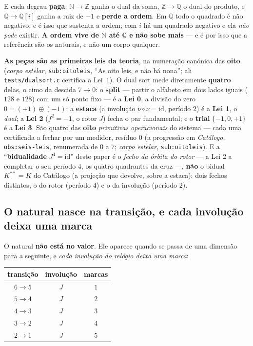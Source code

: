 \documentclass[11pt,a4paper]{article}
\newcommand{\code}[1]{\texttt{\small #1}}
\newcommand{\N}{\ensuremath{\mathbb{N}}}
\newcommand{\Z}{\ensuremath{\mathbb{Z}}}
\newcommand{\Q}{\ensuremath{\mathbb{Q}}}
\begin{document}
\noindent E cada degrau \textbf{paga}: $\N\to\Z$ ganha o dual da soma, $\Z\to\Q$ o dual do
produto, e $\Q\to\Q[i]$ ganha a raiz de $-1$ e \textbf{perde a ordem}. Em $\Q$ todo o quadrado é
não negativo, e é isso que sustenta a ordem; com $i$ há um quadrado negativo e ela \emph{não pode}
existir. \textbf{A ordem vive de $\N$ até $\Q$ e não sobe mais} --- e é por isso que a referência
são os naturais, e não um corpo qualquer.

\smallskip
\noindent \textbf{As peças são as primeiras leis da teoria}, na numeração canónica das \textbf{oito}
(\emph{corpo estelar}, \code{sub:oitoleis}, ``As oito leis, e não há nona''; ali \code{tests/dualsort.c}
certifica a Lei~$1$). O dual sort mede diretamente \textbf{quatro} delas, o cimo da descida $7\to0$: o
\textbf{split} --- partir o alfabeto em dois lados iguais ($128$ e $128$) com um só ponto fixo --- é a
\textbf{Lei 0}, a divisão do zero $0=(+1)\oplus(-1)$; a \textbf{estaca} (a involução
$\nu\circ\nu=\mathrm{id}$, período $2$) é a \textbf{Lei 1}, o \emph{dual}; a \textbf{Lei 2}
($f^{2}=-1$, o rotor $J$) fecha o par fundamental; e o \textbf{trial} $\{-1,0,+1\}$ é a \textbf{Lei 3}.
São quatro das \textbf{oito} \emph{primitivas operacionais} do sistema --- cada uma certificada a fechar
por um medidor, resíduo $0$ (a progressão em \emph{Catálogo}, \code{obs:seis-leis}, renumerada de $0$ a
$7$; \emph{corpo estelar}, \code{sub:oitoleis}). E a ``\textbf{bidualidade}
$J^{4}=\mathrm{id}$'' deste paper é o \emph{fecho da órbita do rotor} --- a Lei 2 a completar o seu
período $4$, os quatro quadrantes da cruz ---, \textbf{não} o bidual $K^{**}=K$ do Catálogo (a projeção
que devolve, sobre a estaca): dois fechos distintos, o do rotor (período $4$) e o da involução
(período $2$).

\subsection*{O natural nasce na transição, e cada involução deixa uma marca}

O natural \textbf{não está no valor}. Ele aparece quando se passa de uma dimensão para a
seguinte, e \emph{cada involução do relógio deixa uma marca}:

\begin{center}\small
\begin{tabular}{@{}ccc@{}}
\toprule
transição & involução & marcas \\
\midrule
$6\to5$ & $J$ & $1$ \\
$5\to4$ & $J$ & $2$ \\
$4\to3$ & $J$ & $3$ \\
$3\to2$ & $J$ & $4$ \\
$2\to1$ & $J$ & $5$ \\
\bottomrule
\end{tabular}
\end{center}
\end{document}
